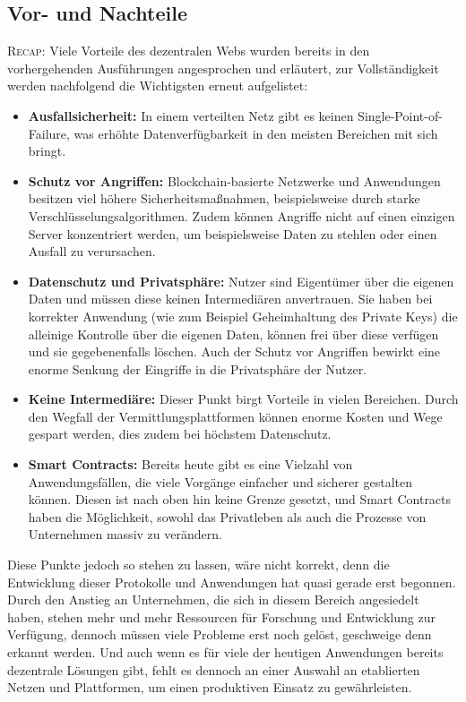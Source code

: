 \subsection{Vor- und Nachteile}

\textsc{Recap:} Viele Vorteile des dezentralen Webs wurden bereits in den vorhergehenden Ausführungen angesprochen und erläutert, zur Vollständigkeit werden nachfolgend die Wichtigsten erneut aufgelistet:

\begin{itemize}
	\item \textbf{Ausfallsicherheit:} In einem verteilten Netz gibt es keinen Single-Point-of-Failure, was erhöhte Datenverfügbarkeit in den meisten Bereichen mit sich bringt.
	\item \textbf{Schutz vor Angriffen:} Blockchain-basierte Netzwerke und Anwendungen besitzen viel höhere Sicherheitsmaßnahmen, beispielsweise durch starke Verschlüsselungsalgorithmen. Zudem können Angriffe nicht auf einen einzigen Server konzentriert werden, um beispielsweise Daten zu stehlen oder einen Ausfall zu verursachen.
	\item \textbf{Datenschutz und Privatsphäre:} Nutzer sind Eigentümer über die eigenen Daten und müssen diese keinen Intermediären anvertrauen. Sie haben bei korrekter Anwendung (wie zum Beispiel Geheimhaltung des Private Keys) die alleinige Kontrolle über die eigenen Daten, können frei über diese verfügen und sie gegebenenfalls löschen. Auch der Schutz vor Angriffen bewirkt eine enorme Senkung der Eingriffe in die Privatsphäre der Nutzer.
	\item \textbf{Keine Intermediäre:} Dieser Punkt birgt Vorteile in vielen Bereichen. Durch den Wegfall der Vermittlungsplattformen können enorme Kosten und Wege gespart werden, dies zudem bei höchstem Datenschutz.
	\item \textbf{Smart Contracts:} Bereits heute gibt es eine Vielzahl von Anwendungsfällen, die viele Vorgänge einfacher und sicherer gestalten können. Diesen ist nach oben hin keine Grenze gesetzt, und Smart Contracts haben die Möglichkeit, sowohl das Privatleben als auch die Prozesse von Unternehmen massiv zu verändern.
\end{itemize}

\smallskip

Diese Punkte jedoch so stehen zu lassen, wäre nicht korrekt, denn die Entwicklung dieser Protokolle und Anwendungen hat quasi gerade erst begonnen. Durch den Anstieg an Unternehmen, die sich in diesem Bereich angesiedelt haben, stehen mehr und mehr Ressourcen für Forschung und Entwicklung zur Verfügung, dennoch müssen viele Probleme erst noch gelöst, geschweige denn erkannt werden. Und auch wenn es für viele der heutigen Anwendungen bereits dezentrale Lösungen gibt, fehlt es dennoch an einer Auswahl an etablierten Netzen und Plattformen, um einen produktiven Einsatz zu gewährleisten. 


